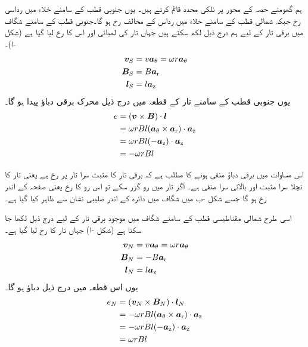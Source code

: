 ہم گھومتے حصہ کے محور پر نلکی محدد قائم کرتے ہیں۔ یوں جنوبی قطب کے سامنے خلاء میں  رداسی رخ جبکہ شمالی  قطب کے سامنے  خلاء میں   رداس کے مخالف رخ ہو گا۔جنوبی قطب کے سامنے شگاف میں برقی تار   کے لیے ہم درج ذیل لکھ سکتے ہیں جہاں تار کی لمبائی  اور اس کا رخ  لیا گیا ہے (شکل -ا)۔
\begin{gather}
\begin{aligned}
{\ensuremath{{\boldsymbol{v}}}}_S&=v {\boldsymbol{a}}_{\theta} =\omega r {\boldsymbol{a}}_{\theta}\\
{{\boldsymbol{B}}}_S&=B {\boldsymbol{a}}_{\textup{r}}\\
{{\boldsymbol{l}}}_S&=l {\boldsymbol{a}}_{\textup{z}}
\end{aligned}
\end{gather}
یوں  جنوبی قطب کے سامنے تار کے قطعہ  میں درج ذیل محرک برقی دباؤ پیدا ہو گا۔
\begin{gather}
\begin{aligned}
e&=({{\boldsymbol{v}}} \times {\ensuremath{{\boldsymbol{B}}}}) \cdot {\ensuremath{{\boldsymbol{l}}}}\\
&=\omega r B l  ({\boldsymbol{a}}_{\theta} \times {\boldsymbol{a}}_{\textup{r}}) \cdot {\boldsymbol{a}}_{\textup{z}}\\
&=\omega r B l  (-{\boldsymbol{a}}_{\textup{z}}) \cdot {\boldsymbol{a}}_{\textup{z}}\\
&=-\omega r B l 
\end{aligned}
\end{gather}

اس مساوات میں برقی دباؤ منفی ہونے کا مطلب ہے کہ برقی تار کا مثبت سرا تار پر  رخ ہے یعنی تار کا نچلا سرا مثبت اور بالائی سرا منفی ہے۔ اگر   تار میں  رو گزر سکے تو اس رو کا رخ   یعنی صفحہ کے   اندر رخ ہو گا جسے  شکل -ب میں  شگاف میں دائرہ کے اندر صلیبی نشان سے ظاہر کیا گیا ہے۔ 

اسی طرح شمالی مقناطیسی قطب کے سامنے شگاف میں موجود برقی تار کے لیے درج ذیل لکھا جا سکتا ہے (شکل -ا) جہاں تار کا رخ  لیا گیا ہے۔
\begin{gather}
\begin{aligned}
{\ensuremath{{\boldsymbol{v}}}}_N&=v {\boldsymbol{a}}_{\theta}=\omega r{\boldsymbol{a}}_{\theta}\\
{{\boldsymbol{B}}}_N&=-B {\boldsymbol{a}}_{\textup{r}}\\
{{\boldsymbol{l}}}_N&=l {\boldsymbol{a}}_{\textup{z}}
\end{aligned}
\end{gather}
یوں اس قطعہ میں درج ذیل دباؤ ہو گا۔
\begin{gather}
\begin{aligned}
e_N&=({{\boldsymbol{v}}}_N \times {\ensuremath{{\boldsymbol{B}}}}_N)\cdot {\ensuremath{{\boldsymbol{l}}}}_N\\
&=-\omega rB l ({\boldsymbol{a}}_{\theta} \times {\boldsymbol{a}}_{\textup{r}}) \cdot {\boldsymbol{a}}_{\textup{z}}\\
&=-\omega r B l (-{\boldsymbol{a}}_{\textup{z}}) \cdot {\boldsymbol{a}}_{\textup{z}}\\
&=\omega r B l 
\end{aligned}
\end{gather}

